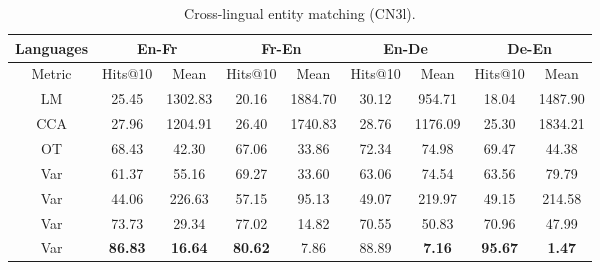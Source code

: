 \documentclass{article}
\begin{document}
\begin{table*}[t!]
\centering
\begin{minipage}[t]{0.63\linewidth}
\captionsetup{justification=centering}
\caption{Cross-lingual entity matching (CN3l).}
\label{table:CN3l_entity_matching}
\scriptsize			
\begin{tabular}{c|cc|cc|cc|cc}
\bhline
Languages&\multicolumn{2}{c|}{En-Fr} & \multicolumn{2}{c|}{Fr-En} & \multicolumn{2}{c|}{En-De} & \multicolumn{2}{c}{De-En} \\
\hline
Metric&\multicolumn{1}{c}{Hits@10}&\multicolumn{1}{c|}{Mean}&\multicolumn{1}{c}{Hits@10}&\multicolumn{1}{c|}{Mean}&\multicolumn{1}{c}{Hits@10}&\multicolumn{1}{c|}{Mean}&\multicolumn{1}{c}{Hits@10}&\multicolumn{1}{c}{Mean}\\ \bhline
LM&\multicolumn{1}{c}{25.45}&\multicolumn{1}{c|}{1302.83}&\multicolumn{1}{c}{20.16}&\multicolumn{1}{c|}{1884.70}&\multicolumn{1}{c}{30.12}&\multicolumn{1}{c|}{954.71}&\multicolumn{1}{c}{18.04}&\multicolumn{1}{c}{1487.90}\\
CCA&\multicolumn{1}{c}{27.96}&\multicolumn{1}{c|}{1204.91}&\multicolumn{1}{c}{26.40}&\multicolumn{1}{c|}{1740.83}&\multicolumn{1}{c}{28.76}&\multicolumn{1}{c|}{1176.09}&\multicolumn{1}{c}{25.30}&\multicolumn{1}{c}{1834.21}\\
OT&\multicolumn{1}{c}{68.43}&\multicolumn{1}{c|}{42.30}&\multicolumn{1}{c}{67.06}&\multicolumn{1}{c|}{33.86}&\multicolumn{1}{c}{72.34}&\multicolumn{1}{c|}{74.98}&\multicolumn{1}{c}{69.47}&\multicolumn{1}{c}{44.38}\\
\hline
Var&\multicolumn{1}{c}{61.37}&\multicolumn{1}{c|}{55.16}&\multicolumn{1}{c}{69.27}&\multicolumn{1}{c|}{33.60}&\multicolumn{1}{c}{63.06}&\multicolumn{1}{c|}{74.54}&\multicolumn{1}{c}{63.56}&\multicolumn{1}{c}{79.79}\\
Var&\multicolumn{1}{c}{44.06}&\multicolumn{1}{c|}{226.63}&\multicolumn{1}{c}{57.15}&\multicolumn{1}{c|}{95.13}&\multicolumn{1}{c}{49.07}&\multicolumn{1}{c|}{219.97}&\multicolumn{1}{c}{49.15}&\multicolumn{1}{c}{214.58}\\
Var&\multicolumn{1}{c}{73.73}&\multicolumn{1}{c|}{29.34}&\multicolumn{1}{c}{77.02}&\multicolumn{1}{c|}{14.82}&\multicolumn{1}{c}{70.55}&\multicolumn{1}{c|}{50.83}&\multicolumn{1}{c}{70.96}&\multicolumn{1}{c}{47.99}\\
Var&\multicolumn{1}{c}{\textbf{86.83}}&\multicolumn{1}{c|}{\textbf{16.64}}&\multicolumn{1}{c}{\textbf{80.62}}&\multicolumn{1}{c|}{7.86}&\multicolumn{1}{c}{88.89}&\multicolumn{1}{c|}{\textbf{7.16}}&\multicolumn{1}{c}{\textbf{95.67}}&\multicolumn{1}{c}{\textbf{1.47}}\\

\end{tabular}
\end{minipage}
\end{table*}
\end{document}
